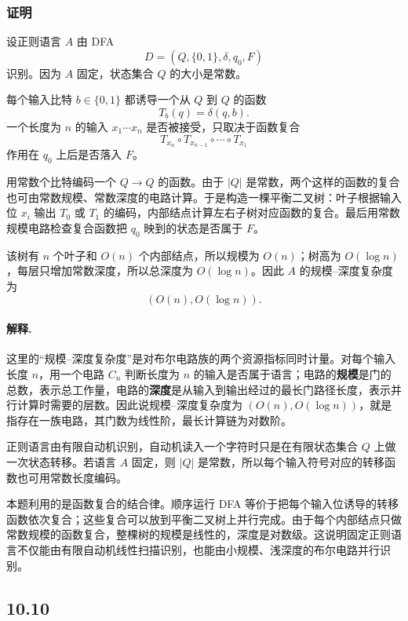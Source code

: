 \begin{answerred}
\subsubsection*{证明}

设正则语言 $A$ 由 DFA
\[
D=(Q,\{0,1\},\delta,q_0,F)
\]
识别。因为 $A$ 固定，状态集合 $Q$ 的大小是常数。

每个输入比特 $b\in\{0,1\}$ 都诱导一个从 $Q$ 到 $Q$ 的函数
\[
T_b(q)=\delta(q,b).
\]
一个长度为 $n$ 的输入 $x_1\cdots x_n$ 是否被接受，只取决于函数复合
\[
T_{x_n}\circ T_{x_{n-1}}\circ\cdots\circ T_{x_1}
\]
作用在 $q_0$ 上后是否落入 $F$。

用常数个比特编码一个 $Q\to Q$ 的函数。由于 $|Q|$ 是常数，两个这样的函数的复合也可由常数规模、常数深度的电路计算。于是构造一棵平衡二叉树：叶子根据输入位 $x_i$ 输出 $T_0$ 或 $T_1$ 的编码，内部结点计算左右子树对应函数的复合。最后用常数规模电路检查复合函数把 $q_0$ 映到的状态是否属于 $F$。

该树有 $n$ 个叶子和 $O(n)$ 个内部结点，所以规模为 $O(n)$；树高为 $O(\log n)$，每层只增加常数深度，所以总深度为 $O(\log n)$。因此 $A$ 的规模--深度复杂度为
\[
(O(n),O(\log n)).
\]

\begin{answernote}
\paragraph{解释.}
这里的“规模--深度复杂度”是对布尔电路族的两个资源指标同时计量。对每个输入长度 $n$，用一个电路 $C_n$ 判断长度为 $n$ 的输入是否属于语言；电路的\textbf{规模}是门的总数，表示总工作量，电路的\textbf{深度}是从输入到输出经过的最长门路径长度，表示并行计算时需要的层数。因此说规模--深度复杂度为 $(O(n),O(\log n))$，就是指存在一族电路，其门数为线性阶，最长计算链为对数阶。

正则语言由有限自动机识别，自动机读入一个字符时只是在有限状态集合 $Q$ 上做一次状态转移。若语言 $A$ 固定，则 $|Q|$ 是常数，所以每个输入符号对应的转移函数也可用常数长度编码。

本题利用的是函数复合的结合律。顺序运行 DFA 等价于把每个输入位诱导的转移函数依次复合；这些复合可以放到平衡二叉树上并行完成。由于每个内部结点只做常数规模的函数复合，整棵树的规模是线性的，深度是对数级。这说明固定正则语言不仅能由有限自动机线性扫描识别，也能由小规模、浅深度的布尔电路并行识别。

\end{answernote}
\end{answerred}
\subsection*{10.10}

